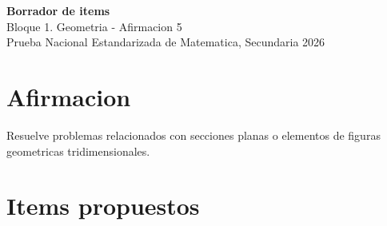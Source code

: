 \documentclass[12pt]{article}
\begin{document}
\begin{center}
  {\Large \textbf{Borrador de items}}\\
  {\large Bloque 1. Geometria - Afirmacion 5}\\[4pt]
  Prueba Nacional Estandarizada de Matematica, Secundaria 2026
\end{center}

\section*{Afirmacion}
Resuelve problemas relacionados con secciones planas o elementos de figuras geometricas tridimensionales.

\section*{Items propuestos}
\end{document}
